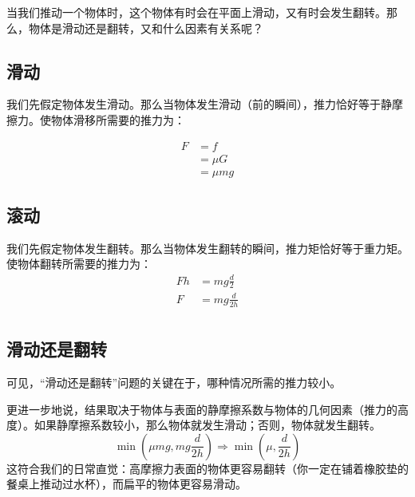 
当我们推动一个物体时，这个物体有时会在平面上滑动，又有时会发生翻转。那么，物体是滑动还是翻转，又和什么因素有关系呢？

\subsection{滑动}
我们先假定物体发生滑动。那么当物体发生滑动（前的瞬间），推力恰好等于静摩擦力。使物体滑移所需要的推力为：

\begin{equation}
\begin{aligned}
F&=f\\
&=\mu G\\
&=\mu mg
\end{aligned}
\end{equation}

\subsection{滚动}
我们先假定物体发生翻转。那么当物体发生翻转的瞬间，推力矩恰好等于重力矩。使物体翻转所需要的推力为：
\begin{equation}
\begin{aligned}
Fh&=mg \frac{d}{2}\\
F&=mg \frac{d}{2h}\\
\end{aligned}
\end{equation}

\subsection{滑动还是翻转}
可见，“滑动还是翻转”问题的关键在于，哪种情况所需的推力较小。

更进一步地说，结果取决于物体与表面的静摩擦系数与物体的几何因素（推力的高度）。如果静摩擦系数较小，那么物体就发生滑动；否则，物体就发生翻转。
\begin{equation}
\min(\mu mg, mg \frac{d}{2h})\Rightarrow
\min(\mu, \frac{d}{2h})
\end{equation}
这符合我们的日常直觉：高摩擦力表面的物体更容易翻转（你一定在铺着橡胶垫的餐桌上推动过水杯），而扁平的物体更容易滑动。
